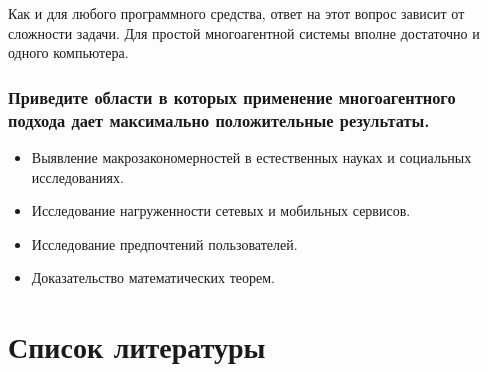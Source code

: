 \documentclass[14pt,a4paper,report]{report}
\begin{document}
Как и для любого программного средства, ответ на этот вопрос зависит от сложности задачи. Для простой многоагентной системы вполне достаточно и одного компьютера.

\subsubsection{Приведите области в которых применение многоагентного подхода дает максимально положительные результаты.}

\begin{itemize}
	\item Выявление макрозакономерностей в естественных науках и социальных исследованиях.
	\item Исследование нагруженности сетевых и мобильных сервисов.
	\item Исследование предпочтений пользователей.
	\item Доказательство математических теорем.
\end{itemize}

\clearpage

\section{Список литературы}
\end{document}
